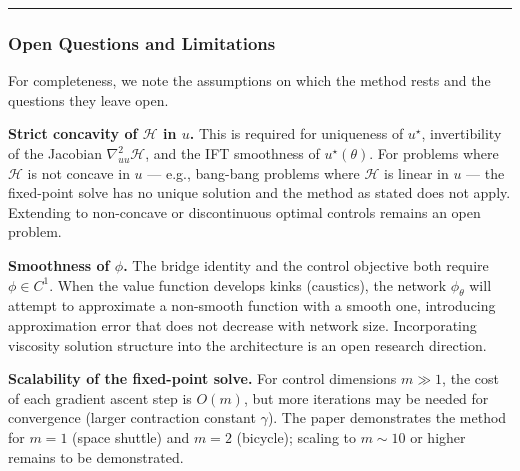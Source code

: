 \documentclass{article}
\begin{document}
\medskip\hrule\medskip

\subsubsection{Open Questions and Limitations}

For completeness, we note the assumptions on which the method rests and the
questions they leave open.

\textbf{Strict concavity of $\mathcal{H}$ in $u$.} This is required for
uniqueness of $u^\star$, invertibility of the Jacobian $\nabla^2_{uu}\mathcal{H}$, and the IFT
smoothness of $u^\star(\theta)$. For problems where $\mathcal{H}$ is not
concave in $u$ --- e.g., bang-bang problems where $\mathcal{H}$ is linear
in $u$ --- the fixed-point solve has no unique solution and the method as stated
does not apply. Extending to non-concave or discontinuous optimal controls
remains an open problem.

\textbf{Smoothness of $\phi$.} The bridge identity and the control
objective both require $\phi \in C^1$. When the value function develops kinks
(caustics), the network $\phi_\theta$ will attempt to approximate a
non-smooth function with a smooth one, introducing approximation error that
does not decrease with network size. Incorporating viscosity solution
structure into the architecture is an open research direction.

\textbf{Scalability of the fixed-point solve.} For control dimensions $m \gg 1$,
the cost of each gradient ascent step is $O(m)$, but more iterations may be
needed for convergence (larger contraction constant $\gamma$).
The paper demonstrates the method for $m = 1$ (space shuttle) and $m = 2$
(bicycle); scaling to $m \sim 10$ or higher remains to be demonstrated.
\end{document}
